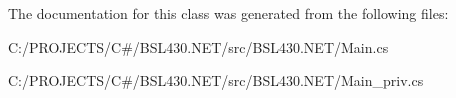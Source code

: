 The documentation for this class was generated from the following files\+:\begin{DoxyCompactItemize}
\item 
C\+:/\+P\+R\+O\+J\+E\+C\+T\+S/\+C\#/\+B\+S\+L430.\+N\+E\+T/src/\+B\+S\+L430.\+N\+E\+T/Main.\+cs\item 
C\+:/\+P\+R\+O\+J\+E\+C\+T\+S/\+C\#/\+B\+S\+L430.\+N\+E\+T/src/\+B\+S\+L430.\+N\+E\+T/Main\+\_\+priv.\+cs\end{DoxyCompactItemize}
